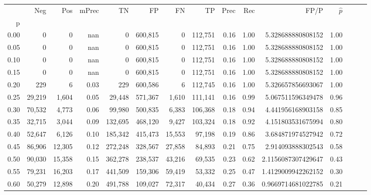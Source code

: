 \begin{tabular}{rrrrrrrrrrrrrrr}
\toprule
{} &     Neg &     Pos & mPrec &       TN &       FP &       FN &       TP &  Prec &   Rec &                  FP/P & $\hat{p}$ \\
p    &         &         &       &          &          &          &          &       &       &                       &           \\
\midrule
0.00 &       0 &       0 &   nan &        0 &  600,815 &        0 &  112,751 &  0.16 &  1.00 &     5.328688880808152 &      1.00 \\
0.05 &       0 &       0 &   nan &        0 &  600,815 &        0 &  112,751 &  0.16 &  1.00 &     5.328688880808152 &      1.00 \\
0.10 &       0 &       0 &   nan &        0 &  600,815 &        0 &  112,751 &  0.16 &  1.00 &     5.328688880808152 &      1.00 \\
0.15 &       0 &       0 &   nan &        0 &  600,815 &        0 &  112,751 &  0.16 &  1.00 &     5.328688880808152 &      1.00 \\
0.20 &     229 &       6 &  0.03 &      229 &  600,586 &        6 &  112,745 &  0.16 &  1.00 &     5.326657856693067 &      1.00 \\
0.25 &  29,219 &   1,604 &  0.05 &   29,448 &  571,367 &    1,610 &  111,141 &  0.16 &  0.99 &     5.067511596349478 &      0.96 \\
0.30 &  70,532 &   4,773 &  0.06 &   99,980 &  500,835 &    6,383 &  106,368 &  0.18 &  0.94 &     4.441956168903158 &      0.85 \\
0.35 &  32,715 &   3,044 &  0.09 &  132,695 &  468,120 &    9,427 &  103,324 &  0.18 &  0.92 &     4.151803531675994 &      0.80 \\
0.40 &  52,647 &   6,126 &  0.10 &  185,342 &  415,473 &   15,553 &   97,198 &  0.19 &  0.86 &     3.684871974527942 &      0.72 \\
0.45 &  86,906 &  12,305 &  0.12 &  272,248 &  328,567 &   27,858 &   84,893 &  0.21 &  0.75 &     2.914093888302543 &      0.58 \\
0.50 &  90,030 &  15,358 &  0.15 &  362,278 &  238,537 &   43,216 &   69,535 &  0.23 &  0.62 &    2.1156087307429647 &      0.43 \\
0.55 &  79,231 &  16,203 &  0.17 &  441,509 &  159,306 &   59,419 &   53,332 &  0.25 &  0.47 &    1.4129009942262152 &      0.30 \\
0.60 &  50,279 &  12,898 &  0.20 &  491,788 &  109,027 &   72,317 &   40,434 &  0.27 &  0.36 &    0.9669714681022785 &      0.21 \\

\end{tabular}
